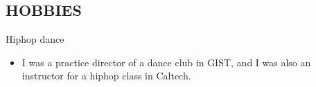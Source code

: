 \documentclass[margin, 10pt]{res} %
\begin{document}
\begin{resume}

\section{HOBBIES} 

Hiphop dance
\begin{itemize}
\item[] I was a practice director of a dance club in GIST, and I was also an instructor for a hiphop class in Caltech.
\end{itemize}



\end{resume}
\end{document}
